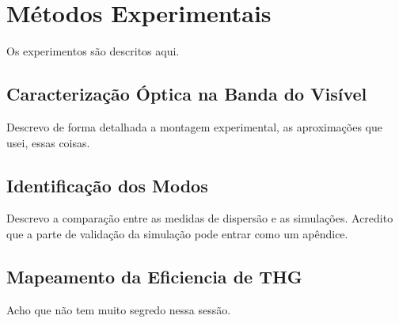\chapter{Métodos Experimentais}
Os experimentos são descritos aqui. 

\section{Caracterização Óptica na Banda do Visível}
Descrevo de forma detalhada a montagem experimental, as aproximações que usei, essas coisas. 

\section{Identificação dos Modos}
Descrevo a comparação entre as medidas de dispersão e as simulações. Acredito que a parte de validação da simulação pode entrar como um apêndice. 

\section{Mapeamento da Eficiencia de THG}
Acho que não tem muito segredo nessa sessão. 